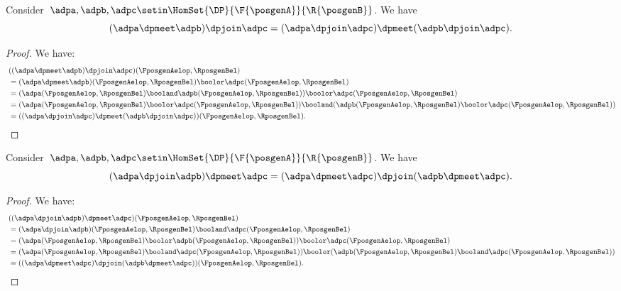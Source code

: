 \begin{lemma}
    \label{lem:vee_wedge}
    Consider~$\adpa,\adpb,\adpc\setin \HomSet{\DP}{\F{\posgenA}}{\R{\posgenB}}$.
    We have
    \begin{equation}
        (\adpa \dpmeet \adpb)
        \dpjoin \adpc=(\adpa \dpjoin \adpc) \dpmeet (\adpb\dpjoin \adpc).
    \end{equation}
\end{lemma}
\begin{proof}
    We have:
    \begin{equation}
        \begin{aligned}
            ~ & ((\adpa \dpmeet \adpb)\dpjoin \adpc)(\FposgenAelop,\RposgenBel) \\
              & =
            (\adpa \dpmeet \adpb)(\FposgenAelop,\RposgenBel)\boolor \adpc(\FposgenAelop,\RposgenBel) \\
              & =(\adpa(\FposgenAelop,\RposgenBel) \booland \adpb(\FposgenAelop,\RposgenBel))\boolor \adpc(\FposgenAelop,\RposgenBel) \\
              & =(\adpa(\FposgenAelop,\RposgenBel) \boolor  \adpc(\FposgenAelop,\RposgenBel)) \booland (\adpb(\FposgenAelop,\RposgenBel)\boolor \adpc(\FposgenAelop,\RposgenBel)) \\
              & =((\adpa \dpjoin \adpc) \dpmeet (\adpb\dpjoin \adpc))(\FposgenAelop,\RposgenBel).
        \end{aligned}
    \end{equation}
\end{proof}

\begin{lemma}
    \label{lem:wedge_vee}
    Consider~$\adpa,\adpb,\adpc\setin \HomSet{\DP}{\F{\posgenA}}{\R{\posgenB}}$.
    We have
    \begin{equation}
        (\adpa \dpjoin \adpb)
        \dpmeet \adpc=(\adpa \dpmeet \adpc) \dpjoin (\adpb\dpmeet \adpc).
    \end{equation}
\end{lemma}
\begin{proof}
    We have:
    \begin{equation}
        \begin{aligned}
            ~ & ((\adpa \dpjoin \adpb)\dpmeet \adpc)(\FposgenAelop,\RposgenBel) \\
              & = (\adpa \dpjoin \adpb)(\FposgenAelop,\RposgenBel)\booland \adpc(\FposgenAelop,\RposgenBel) \\
              & =(\adpa(\FposgenAelop,\RposgenBel) \boolor \adpb(\FposgenAelop,\RposgenBel))\boolor \adpc(\FposgenAelop,\RposgenBel) \\
              & =(\adpa(\FposgenAelop,\RposgenBel) \booland  \adpc(\FposgenAelop,\RposgenBel)) \boolor (\adpb(\FposgenAelop,\RposgenBel)\booland \adpc(\FposgenAelop,\RposgenBel)) \\
              & =((\adpa \dpmeet \adpc) \dpjoin (\adpb\dpmeet \adpc))(\FposgenAelop,\RposgenBel).
        \end{aligned}
    \end{equation}
\end{proof}

